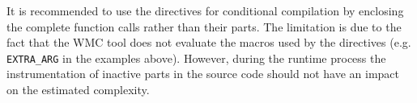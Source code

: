 It is recommended to use the directives for conditional compilation by enclosing the complete function calls rather than their parts. The limitation is due to the fact that the WMC tool does not evaluate the macros used by the directives (e.g. \verb|EXTRA_ARG| in the examples above). However, during the runtime process the instrumentation of inactive parts in the source code should not have an impact on the estimated complexity. 
